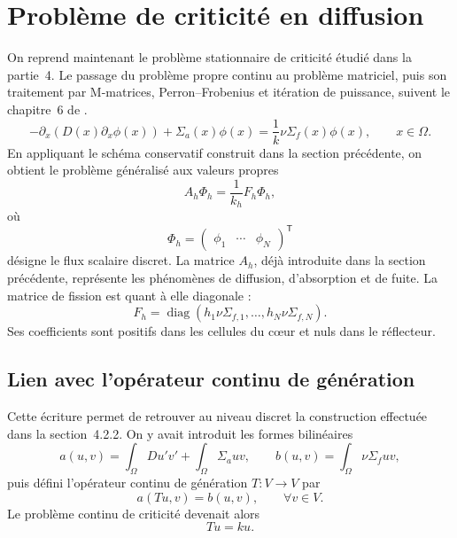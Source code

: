 \documentclass{article}
\begin{document}
\section {Problème de criticité en diffusion}
\label{subsec:criticite-diffusion-discrete}

On reprend maintenant le problème stationnaire de criticité étudié dans la
partie~4. Le passage du problème propre continu au problème matriciel, puis son traitement par M-matrices, Perron--Frobenius et itération de puissance, suivent le chapitre~6 de \textcite{Allaire2018}.
\begin{equation}
    -\partial_x\!\left(D(x)\partial_x\phi(x)\right)
    +\Sigma_a(x)\phi(x)
    =
    \frac{1}{k}\nu\Sigma_f(x)\phi(x),
    \qquad x\in\Omega.
    \label{eq:criticite-diffusion-continue}
\end{equation}
En appliquant le schéma conservatif construit dans la section précédente,
on obtient le problème généralisé aux valeurs propres
\begin{equation}
    A_h\Phi_h
    =
    \frac{1}{k_h}F_h\Phi_h,
    \label{eq:criticite-diffusion-discrete}
\end{equation}
où
\[
    \Phi_h=
    \begin{pmatrix}
        \phi_1&\cdots&\phi_N
    \end{pmatrix}^{\mathsf T}
\]
désigne le flux scalaire discret. La matrice $A_h$, déjà introduite dans
la section précédente, représente les phénomènes de diffusion,
d'absorption et de fuite. La matrice de fission est quant à elle
diagonale :
\begin{equation}
    F_h
    =
    \operatorname{diag}
    \left(
        h_1\nu\Sigma_{f,1},
        \ldots,
        h_N\nu\Sigma_{f,N}
    \right).
    \label{eq:matrice-fission}
\end{equation}
Ses coefficients sont positifs dans les cellules du cœur et nuls dans
le réflecteur.

\subsection {Lien avec l'opérateur continu de génération}

Cette écriture permet de retrouver au niveau discret la construction
effectuée dans la section~4.2.2. On y avait introduit les formes
bilinéaires
\[
    a(u,v)
    =
    \int_\Omega D u'v'
    +
    \int_\Omega \Sigma_a uv,
    \qquad
    b(u,v)
    =
    \int_\Omega \nu\Sigma_f uv,
\]
puis défini l'opérateur continu de génération $T:V\to V$ par
\[
    a(Tu,v)=b(u,v),
    \qquad \forall v\in V.
\]
Le problème continu de criticité devenait alors
\[
    Tu=ku.
\]
\end{document}
